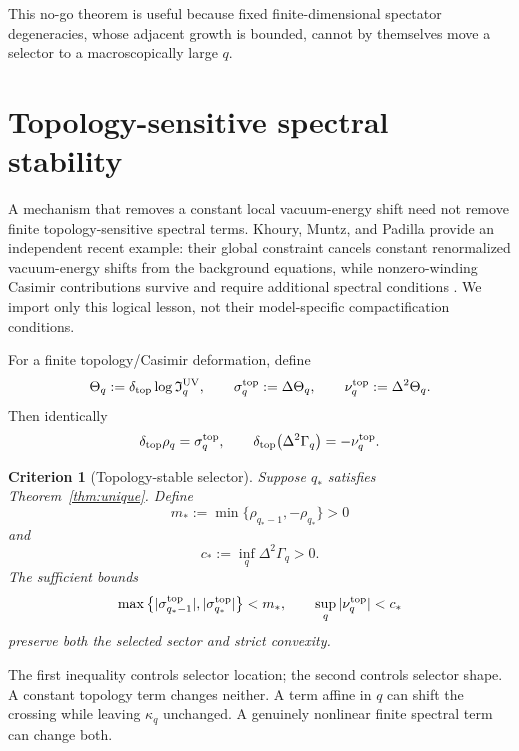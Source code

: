 \documentclass[aps,prd,preprint,nofootinbib,superscriptaddress]{revtex4-2}
\newtheorem{criterion}[theorem]{Criterion}
\theoremstyle{definition}
\theoremstyle{remark}
\newcommand{\UV}{\mathrm{UV}}
\newcommand{\cI}{\mathfrak I}
\begin{document}
This no-go theorem is useful because fixed finite-dimensional spectator degeneracies, whose adjacent growth is bounded, cannot by themselves move a selector to a macroscopically large $q$.


\section{Topology-sensitive spectral stability}\label{sec:topology}

A mechanism that removes a constant local vacuum-energy shift need not remove finite topology-sensitive spectral terms.  Khoury, Muntz, and Padilla provide an independent recent example: their global constraint cancels constant renormalized vacuum-energy shifts from the background equations, while nonzero-winding Casimir contributions survive and require additional spectral conditions \cite{KhouryMuntzPadilla2026}.  We import only this logical lesson, not their model-specific compactification conditions.

For a finite topology/Casimir deformation, define
\begin{equation}
\Theta_q
:=
\delta_{\rm top}\log\cI_q^{\UV},
\qquad
\sigma_q^{\rm top}:=\Delta\Theta_q,
\qquad
\nu_q^{\rm top}:=\Delta^2\Theta_q.
\label{eq:topresponses}
\end{equation}
Then identically
\begin{equation}
\delta_{\rm top}\rho_q=\sigma_q^{\rm top},
\qquad
\delta_{\rm top}\!\left(\Delta^2\Gamma_q\right)
=
-\nu_q^{\rm top}.
\label{eq:topidentity}
\end{equation}

\begin{criterion}[Topology-stable selector]
\label{crit:topstable}
Suppose $q_*$ satisfies Theorem~\ref{thm:unique}.  Define
\begin{equation}
m_*:=\min\{\rho_{q_*-1},-\rho_{q_*}\}>0
\end{equation}
and
\begin{equation}
c_*:=\inf_q\Delta^2\Gamma_q>0.
\end{equation}
The sufficient bounds
\begin{equation}
\max\left\{
|\sigma_{q_*-1}^{\rm top}|,
|\sigma_{q_*}^{\rm top}|
\right\}<m_*,
\qquad
\sup_q|\nu_q^{\rm top}|<c_*
\label{eq:stabilitybounds}
\end{equation}
preserve both the selected sector and strict convexity.
\end{criterion}

The first inequality controls selector location; the second controls selector shape.  A constant topology term changes neither.  A term affine in $q$ can shift the crossing while leaving $\kappa_q$ unchanged.  A genuinely nonlinear finite spectral term can change both.
\end{document}
